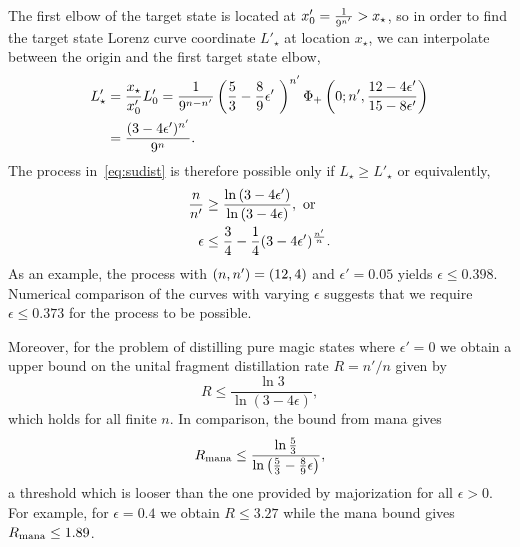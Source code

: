 \documentclass[pra,
aps,
twocolumn,
superscriptaddress,
groupedaddress,
nofootinbib,
reprint
]{revtex4-1}
\begin{document}
The first elbow of the target state is located at $x'_0 = \frac{1}{9^{\tt}} > x_\star$, so in order to find the target state Lorenz curve coordinate $L'_\star$ at location $x_\star$, we can interpolate between the origin and the first target state elbow, 
\begin{equation}
	\begin{split}
	L'_\star &= \frac{x_\star}{x'_0}L'_0 = \frac{1}{9^{\nn-\tt}}\left( \frac{5}{3} - \frac{8}{9}\epsilon'\ \right)^{\tt}\Phi_+\left(0;\tt,\frac{12-4\epsilon'}{15-8\epsilon'}\right) \\
	&= \frac{(3-4\epsilon')^{\tt}}{9^{\nn}}.
	\end{split}
\end{equation}
The process in~\cref{eq:sudist} is therefore possible only if $L_\star \geq L'_\star$ or equivalently,
\begin{align}
	\frac{n}{n'} &\geq \frac{\ln{(3-4\epsilon')}}{\ln{(3-4\epsilon)}}, \text{ or}\\
	\epsilon &\leq \frac{3}{4} - \frac{1}{4}(3-4\epsilon')^{\frac{\tt}{\nn}}.
\end{align}
As an example, the process with $(\nn, \tt) = (12, 4)$ and $\epsilon' = 0.05$ yields $\epsilon \leq 0.398$.
Numerical comparison of the curves with varying $\epsilon$ suggests that we require $\epsilon \leq 0.373$ for the process to be possible.

Moreover, for the problem of distilling pure magic states where $\epsilon'=0$ we obtain a upper bound on the unital fragment distillation rate $R=n'/n$ given by
\begin{equation}
R \leq \frac{\ln 3}{\ln (3-4 \epsilon)},
\end{equation}
which holds for all finite $n$. 
In comparison, the bound from mana gives 
\begin{equation}
	R_{\rm{mana}} \leq \frac{\ln \frac{5}{3}}{\ln \left(\frac{5}{3} - \frac{8}{9}\epsilon \right)},
\end{equation}
a threshold which is looser than the one provided by majorization for all $\epsilon > 0$. For example, for $\epsilon = 0.4$ we obtain $R\le 3.27 $ while the mana bound gives $R_{\rm{mana}} \le 1.89$. 
\end{document}
